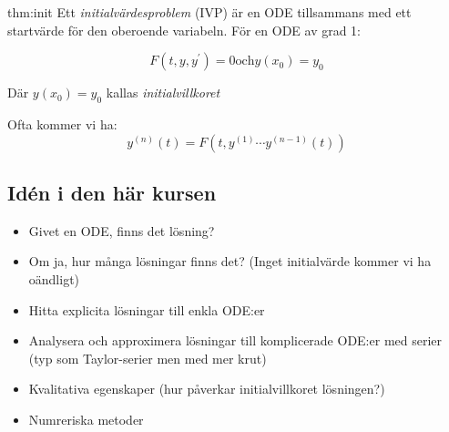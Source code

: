 \begin{theo}[Initialvärdesproblem]{thm:init}
  Ett \textit{initialvärdesproblem} (IVP) är en ODE tillsammans med ett startvärde för den oberoende variabeln. För en ODE av grad 1:
  \par\bigskip

  \begin{equation*}
    F(t,y,y^{\prime})=0 \text{och} y(x_0)=y_0
  \end{equation*}
  \par\bigskip

  Där $y(x_0)=y_0$ kallas \textit{initialvillkoret}
\end{theo}
\par\bigskip

\noindent Ofta kommer vi ha:
\begin{equation*}
  y^{(n)}(t)= F(t,y^{(1)}\cdots y^{(n-1)}(t))
\end{equation*}
\par\bigskip

\subsection{Idén i den här kursen}
\par\bigskip

\begin{itemize}
  \item Givet en ODE, finns det lösning?
  \item Om ja, hur många lösningar finns det? (Inget initialvärde kommer vi ha oändligt)
  \item Hitta explicita lösningar till enkla ODE:er
  \item Analysera och approximera lösningar till komplicerade ODE:er med serier (typ som Taylor-serier men med mer krut)
  \item Kvalitativa egenskaper (hur påverkar initialvillkoret lösningen?)
  \item Numreriska metoder
\end{itemize}

